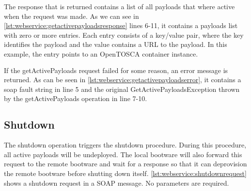 The response that is returned contains a list of all payloads that where active when the request was made.
As we can see in \autoref{lst:webservice:getactivepayloadsresponse} lines 6-11, it contains a payloads list with zero or more entries.
Each entry consists of a key/value pair, where the key identifies the payload and the value contains a URL to the payload.
In this example, the entry points to an OpenTOSCA container instance.

\vspace*{\baselineskip}

If the getActivePayloads request failed for some reason, an error message is returned.
As can be seen in \autoref{lst:webservice:getactivepayloadserror}, it contains a soap fault string in line 5 and the original GetActivePayloadsException thrown by the getActivePayloads operation in line 7-10.

\vspace*{\baselineskip}

\subsection{Shutdown}

The shutdown operation triggers the shutdown procedure.
During this procedure, all active payloads will be undeployed.
The local bootware will also forward this request to the remote bootware and wait for a response so that it can deprovision the remote bootware before shutting down itself.
\autoref{lst:webservice:shutdownrequest} shows a shutdown request in a SOAP message.
No parameters are required.

\vspace*{\baselineskip}


